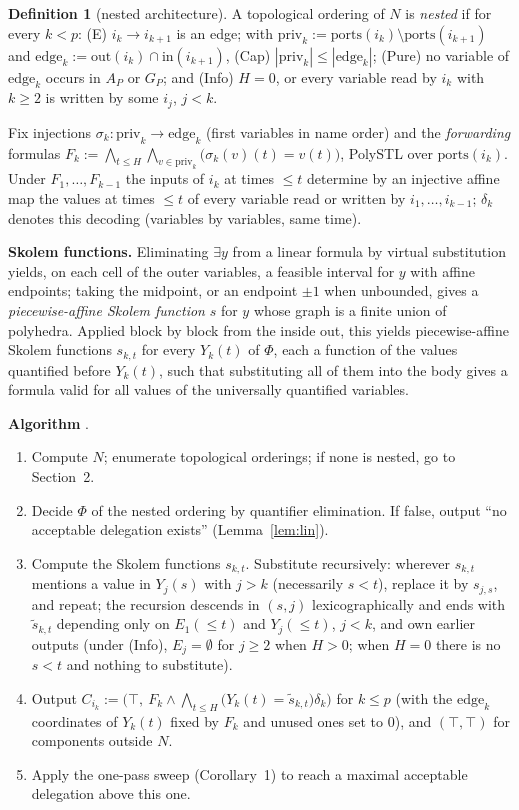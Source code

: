 \documentclass[10pt]{article}
\theoremstyle{plain}\newtheorem{theorem}{Theorem}\newtheorem{lemma}{Lemma}\newtheorem{proposition}{Proposition}
\theoremstyle{definition}\newtheorem{definition}{Definition}\newtheorem{remark}{Remark}
\newcommand{\ports}{\mathrm{ports}}\newcommand{\inp}{\mathrm{in}}\newcommand{\outp}{\mathrm{out}}\newcommand{\priv}{\mathrm{priv}}\newcommand{\edge}{\mathrm{edge}}
\begin{document}
\begin{definition}[nested architecture]
A topological ordering of $N$ is \emph{nested} if for every $k<p$: (E) $i_k\to i_{k+1}$ is an edge; with $\priv_k:=\ports(i_k)\setminus\ports(i_{k+1})$ and $\edge_k:=\outp(i_k)\cap\inp(i_{k+1})$, (Cap) $|\priv_k|\le|\edge_k|$; (Pure) no variable of $\edge_k$ occurs in $A_P$ or $G_P$; and (Info) $H=0$, or every variable read by $i_k$ with $k\ge2$ is written by some $i_j$, $j<k$.
\end{definition}
Fix injections $\sigma_k:\priv_k\to\edge_k$ (first variables in name order) and the \emph{forwarding} formulas $F_k:=\bigwedge_{t\le H}\bigwedge_{v\in\priv_k}\big(\sigma_k(v)(t)=v(t)\big)$, PolySTL over $\ports(i_k)$. Under $F_1,\dots,F_{k-1}$ the inputs of $i_k$ at times $\le t$ determine by an injective affine map the values at times $\le t$ of every variable read or written by $i_1,\dots,i_{k-1}$; $\delta_k$ denotes this decoding (variables by variables, same time).

\textbf{Skolem functions.} Eliminating $\exists y$ from a linear formula by virtual substitution yields, on each cell of the outer variables, a feasible interval for $y$ with affine endpoints; taking the midpoint, or an endpoint $\pm1$ when unbounded, gives a \emph{piecewise-affine Skolem function} $s$ for $y$ whose graph is a finite union of polyhedra. Applied block by block from the inside out, this yields piecewise-affine Skolem functions $s_{k,t}$ for every $Y_k(t)$ of $\Phi$, each a function of the values quantified before $Y_k(t)$, such that substituting all of them into the body gives a formula valid for all values of the universally quantified variables.

\textbf{Algorithm} \Dl.
\begin{enumerate}
\item Compute $N$; enumerate topological orderings; if none is nested, go to Section~2.
\item Decide $\Phi$ of the nested ordering by quantifier elimination. If false, output ``no acceptable delegation exists'' (Lemma~\ref{lem:lin}).
\item Compute the Skolem functions $s_{k,t}$. Substitute recursively: wherever $s_{k,t}$ mentions a value in $Y_j(s)$ with $j>k$ (necessarily $s<t$), replace it by $s_{j,s}$, and repeat; the recursion descends in $(s,j)$ lexicographically and ends with $\tilde s_{k,t}$ depending only on $E_1(\le t)$ and $Y_j(\le t)$, $j<k$, and own earlier outputs (under (Info), $E_j=\emptyset$ for $j\ge2$ when $H>0$; when $H=0$ there is no $s<t$ and nothing to substitute).
\item Output $C_{i_k}:=\big(\top,\ F_k\wedge\bigwedge_{t\le H}\big(Y_k(t)=\tilde s_{k,t}\big)\delta_k\big)$ for $k\le p$ (with the $\edge_k$ coordinates of $Y_k(t)$ fixed by $F_k$ and unused ones set to $0$), and $(\top,\top)$ for components outside $N$.
\item Apply the one-pass sweep (Corollary~1) to reach a maximal acceptable delegation above this one.
\end{enumerate}
\end{document}
